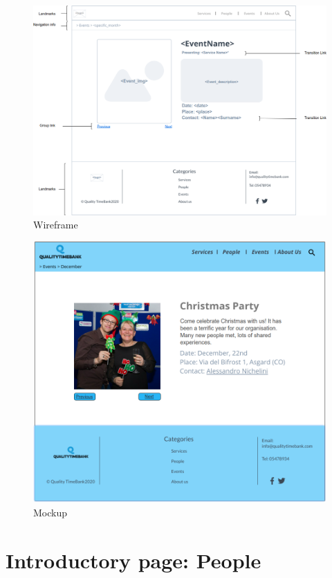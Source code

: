 \documentclass[a4paper, 11pt, parskip=half, headsepline]{scrreprt}
\begin{document}
\begin{figure}[H]
    \centering
    \includegraphics[width=1\linewidth, keepaspectratio]{wireframes/KindOfTopic-Event}
    \caption{Wireframe}
\end{figure}

\begin{figure}[H]
    \centering
    \includegraphics[width=1\linewidth, keepaspectratio]{mockups/ConcreteEventChristmas}
    \caption{Mockup}
\end{figure}

\section{Introductory page: People}
\end{document}
